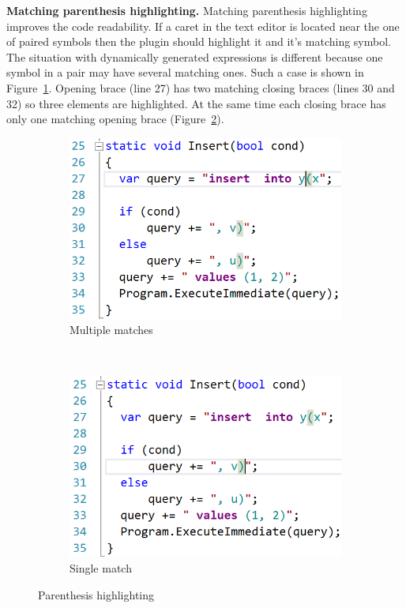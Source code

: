 \documentclass{sig-alternate-05-2015}
\begin{document}
\textbf{Matching parenthesis highlighting.} Matching parenthesis highlighting improves the code readability. If a caret in the text editor is located near the one of paired symbols then the plugin should highlight it and it's matching symbol. The situation with dynamically generated expressions is different because one symbol in a pair may have several matching ones. Such a case is shown in Figure~\ref{brace1}. Opening brace (line 27) has two matching closing braces (lines 30 and 32) so three elements are highlighted. At the same time each closing brace has only one matching opening brace (Figure~\ref{brace2}).

\begin{figure}[h!]
  \begin{center}
    \begin{subfigure}[t]{0.2\textwidth}    
        \includegraphics[scale=0.3]{Figures/brackets_one_to_many.PNG}    
    \caption{Multiple matches}
    \label{brace1}
    \end{subfigure}
	~\qquad
    \begin{subfigure}[t]{0.2\textwidth}      
            \includegraphics[scale=0.3]{Figures/brackets_one_to_one.PNG}        
        \caption{Single match}
        \label{brace2}
    \end{subfigure}
    \caption{Parenthesis highlighting}
    \label{braces}
  \end{center}
\end{figure}
\end{document}

